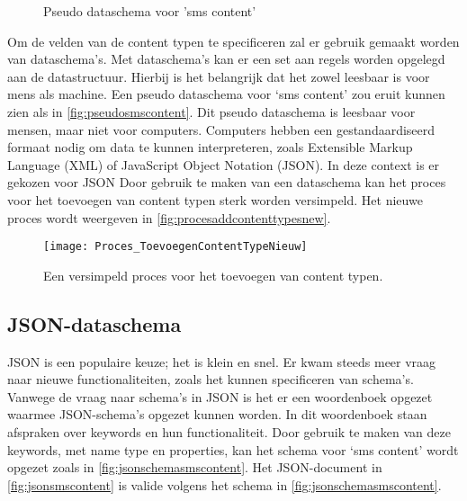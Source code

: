 \begin{wrapfigure}{r}{0.5\textwidth}
    \caption{Pseudo dataschema voor 'sms content'}
    \label{fig:pseudosmscontent}
\end{wrapfigure}

\pagebreak
\noindent Om de velden van de content typen te specificeren zal er gebruik gemaakt worden van dataschema’s. Met dataschema’s kan er een set aan regels worden opgelegd aan de datastructuur. Hierbij is het belangrijk dat het zowel leesbaar is voor mens als machine. Een pseudo dataschema voor ‘sms content’ zou eruit kunnen zien als in \autoref{fig:pseudosmscontent}.
Dit pseudo dataschema is leesbaar voor mensen, maar niet voor computers. Computers hebben een gestandaardiseerd formaat nodig om data te kunnen interpreteren, zoals Extensible Markup Language (XML) of JavaScript Object Notation (JSON). In deze context is er gekozen voor JSON
Door gebruik te maken van een dataschema kan het proces voor het toevoegen van content typen sterk worden versimpeld. Het nieuwe proces wordt weergeven in \autoref{fig:procesaddcontenttypesnew}.

\begin{figure}[htb]
    \centering
    \texttt{[image: Proces\_ToevoegenContentTypeNieuw]}
    \caption{Een versimpeld proces voor het toevoegen van content typen.}
    \label{fig:procesaddcontenttypesnew}
\end{figure}

\pagebreak
\subsection{JSON-dataschema}
JSON is een populaire keuze; het is klein en snel. Er kwam steeds meer vraag naar nieuwe functionaliteiten, zoals het kunnen specificeren van schema’s\cite{Severance2012}. 
Vanwege de vraag naar schema’s in JSON is het er een woordenboek opgezet waarmee JSON-schema’s opgezet kunnen worden\cite{JsonSchemaOrg}. In dit woordenboek staan afspraken over keywords en hun functionaliteit. Door gebruik te maken van deze keywords, met name type en properties, kan het schema voor ‘sms content’ wordt opgezet zoals in \autoref{fig:jsonschemasmscontent}. Het JSON-document in \autoref{fig:jsonsmscontent} is valide volgens het schema in \autoref{fig:jsonschemasmscontent}.

